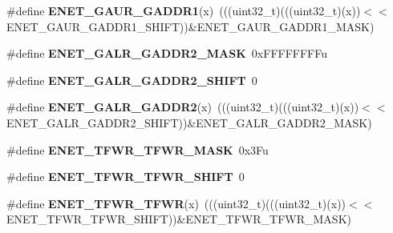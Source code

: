 \begin{DoxyCompactItemize}
\item 
\#define {\bfseries E\+N\+E\+T\+\_\+\+G\+A\+U\+R\+\_\+\+G\+A\+D\+D\+R1}(x)~(((uint32\+\_\+t)(((uint32\+\_\+t)(x))$<$$<$E\+N\+E\+T\+\_\+\+G\+A\+U\+R\+\_\+\+G\+A\+D\+D\+R1\+\_\+\+S\+H\+I\+FT))\&E\+N\+E\+T\+\_\+\+G\+A\+U\+R\+\_\+\+G\+A\+D\+D\+R1\+\_\+\+M\+A\+SK)\hypertarget{group__ENET__Register__Masks_ga18686df13fea6ddef8e4e7583648df89}{}\label{group__ENET__Register__Masks_ga18686df13fea6ddef8e4e7583648df89}

\item 
\#define {\bfseries E\+N\+E\+T\+\_\+\+G\+A\+L\+R\+\_\+\+G\+A\+D\+D\+R2\+\_\+\+M\+A\+SK}~0x\+F\+F\+F\+F\+F\+F\+F\+Fu\hypertarget{group__ENET__Register__Masks_ga8e26a6cd7140a83bfb1209d2359f3442}{}\label{group__ENET__Register__Masks_ga8e26a6cd7140a83bfb1209d2359f3442}

\item 
\#define {\bfseries E\+N\+E\+T\+\_\+\+G\+A\+L\+R\+\_\+\+G\+A\+D\+D\+R2\+\_\+\+S\+H\+I\+FT}~0\hypertarget{group__ENET__Register__Masks_ga972b44abee90b40667709db22c6263a1}{}\label{group__ENET__Register__Masks_ga972b44abee90b40667709db22c6263a1}

\item 
\#define {\bfseries E\+N\+E\+T\+\_\+\+G\+A\+L\+R\+\_\+\+G\+A\+D\+D\+R2}(x)~(((uint32\+\_\+t)(((uint32\+\_\+t)(x))$<$$<$E\+N\+E\+T\+\_\+\+G\+A\+L\+R\+\_\+\+G\+A\+D\+D\+R2\+\_\+\+S\+H\+I\+FT))\&E\+N\+E\+T\+\_\+\+G\+A\+L\+R\+\_\+\+G\+A\+D\+D\+R2\+\_\+\+M\+A\+SK)\hypertarget{group__ENET__Register__Masks_gac34b31c0ced54db9a6d54a2ba5151cad}{}\label{group__ENET__Register__Masks_gac34b31c0ced54db9a6d54a2ba5151cad}

\item 
\#define {\bfseries E\+N\+E\+T\+\_\+\+T\+F\+W\+R\+\_\+\+T\+F\+W\+R\+\_\+\+M\+A\+SK}~0x3\+Fu\hypertarget{group__ENET__Register__Masks_gabf947dfd1da7311bb46602d7415a343d}{}\label{group__ENET__Register__Masks_gabf947dfd1da7311bb46602d7415a343d}

\item 
\#define {\bfseries E\+N\+E\+T\+\_\+\+T\+F\+W\+R\+\_\+\+T\+F\+W\+R\+\_\+\+S\+H\+I\+FT}~0\hypertarget{group__ENET__Register__Masks_ga20649e66e27490be23302b4c87e979b8}{}\label{group__ENET__Register__Masks_ga20649e66e27490be23302b4c87e979b8}

\item 
\#define {\bfseries E\+N\+E\+T\+\_\+\+T\+F\+W\+R\+\_\+\+T\+F\+WR}(x)~(((uint32\+\_\+t)(((uint32\+\_\+t)(x))$<$$<$E\+N\+E\+T\+\_\+\+T\+F\+W\+R\+\_\+\+T\+F\+W\+R\+\_\+\+S\+H\+I\+FT))\&E\+N\+E\+T\+\_\+\+T\+F\+W\+R\+\_\+\+T\+F\+W\+R\+\_\+\+M\+A\+SK)\hypertarget{group__ENET__Register__Masks_ga577c730841ebdcb31dad8bf4a8d864bb}{}\label{group__ENET__Register__Masks_ga577c730841ebdcb31dad8bf4a8d864bb}


\end{DoxyCompactItemize}
